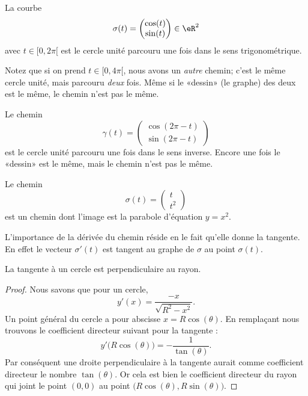 \begin{example}
    La courbe
    \begin{equation}
        \sigma(t)=\begin{pmatrix}
            \cos(t)    \\
            \sin(t)
        \end{pmatrix}\in\eR^2
    \end{equation}
    avec $t\in\mathopen[ 0 , 2\pi [$ est le cercle unité parcouru une fois dans le sens trigonométrique.

    Notez que si on prend $t\in\mathopen[ 0 , 4\pi [$, nous avons un \emph{autre} chemin; c'est le même cercle unité, mais parcouru \emph{deux} fois. Même si le «dessin» (le graphe) des deux est le même, le chemin n'est pas le même.

    Le chemin
    \begin{equation}
        \gamma(t)=\begin{pmatrix}
            \cos(2\pi-t)    \\
            \sin(2\pi-t)
        \end{pmatrix}
    \end{equation}
    est le cercle unité parcouru une fois dans le sens inverse. Encore une fois le «dessin» est le même, mais le chemin n'est pas le même.
\end{example}

\begin{example}
    Le chemin
    \begin{equation}
        \sigma(t)=\begin{pmatrix}
            t    \\
            t^2
        \end{pmatrix}
    \end{equation}
    est un chemin dont l'image est la parabole d'équation $y=x^2$.
\end{example}

L'importance de la dérivée du chemin réside en le fait qu'elle donne la tangente. En effet le vecteur $\sigma'(t)$ est tangent au graphe de $\sigma$ au point $\sigma(t)$.

\begin{corollary}       \label{CorKBEMooRvYAcJ}
    La tangente à un cercle est perpendiculaire au rayon.
\end{corollary}

\begin{proof}
    Nous savons que pour un cercle,
	\begin{equation}
		y'(x)=\frac{ -x }{ \sqrt{R^2-x^2} }.
	\end{equation}
	Un point général du cercle a pour abscisse $x=R\cos(\theta)$. En remplaçant nous trouvons le coefficient directeur suivant pour la tangente :
	\begin{equation}
		y'\big( R\cos(\theta) \big)=-\frac{1}{ \tan(\theta) }.
	\end{equation}
	Par conséquent une droite perpendiculaire à la tangente aurait comme coefficient directeur le nombre $\tan(\theta)$. Or cela est bien le coefficient directeur du rayon qui joint le point $(0,0)$ au point $\big( R\cos(\theta),R\sin(\theta) \big)$.

\end{proof}

